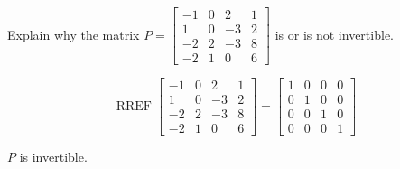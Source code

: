 
\begin{exerciseStatement}


Explain why the matrix \(P= \left[\begin{array}{cccc}
-1 & 0 & 2 & 1 \\
1 & 0 & -3 & 2 \\
-2 & 2 & -3 & 8 \\
-2 & 1 & 0 & 6
\end{array}\right] \) is or is not invertible.


\end{exerciseStatement}
    
\begin{exerciseAnswer} 


\[\operatorname{RREF} \left[\begin{array}{cccc}
-1 & 0 & 2 & 1 \\
1 & 0 & -3 & 2 \\
-2 & 2 & -3 & 8 \\
-2 & 1 & 0 & 6
\end{array}\right] = \left[\begin{array}{cccc}
1 & 0 & 0 & 0 \\
0 & 1 & 0 & 0 \\
0 & 0 & 1 & 0 \\
0 & 0 & 0 & 1
\end{array}\right] \]

\(P\) is invertible.
\end{exerciseAnswer}
    
